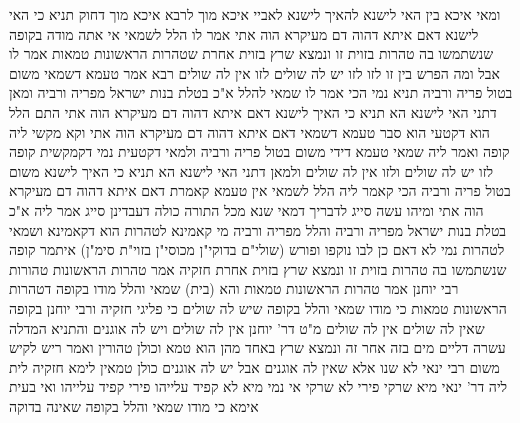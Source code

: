 \documentclass[12pt, openany]{book}
\begin{document}
{ומאי איכא בין האי לישנא להאיך לישנא  לאביי איכא מוך
לרבא איכא מוך דחוק 
תניא כי האי לישנא דאם איתא דהוה דם מעיקרא הוה אתי אמר לו הלל לשמאי  אי אתה מודה בקופה שנשתמשו בה טהרות בזוית זו ונמצא שרץ בזוית אחרת שטהרות הראשונות טמאות  אמר לו  אבל 
ומה הפרש בין זו לזו  לזו יש לה שולים לזו אין לה שולים 
רבא אמר  טעמא דשמאי משום בטול פריה ורביה  תניא נמי הכי אמר לו שמאי להלל  א"כ בטלת בנות ישראל מפריה ורביה 
ומאן דתני האי לישנא הא תניא כי האיך לישנא דאם איתא דהוה דם מעיקרא הוה אתי  התם הלל הוא דקטעי הוא סבר  טעמא דשמאי דאם איתא דהוה דם מעיקרא הוה אתי וקא מקשי ליה קופה 
ואמר ליה שמאי  טעמא דידי משום בטול פריה ורביה ולמאי דקטעית נמי דקמקשית קופה לזו יש לה שולים ולזו אין לה שולים 
ולמאן דתני האי לישנא הא תניא כי האיך לישנא משום בטול פריה ורביה 
הכי קאמר ליה הלל לשמאי  אין טעמא קאמרת דאם איתא דהוה דם מעיקרא הוה אתי ומיהו עשה סייג לדבריך דמאי שנא מכל התורה כולה דעבדינן סייג 
אמר ליה  א"כ בטלת בנות ישראל מפריה ורביה  והלל מפריה ורביה מי קאמינא  לטהרות הוא דקאמינא 
ושמאי לטהרות נמי לא דאם כן לבו נוקפו ופורש 
(שולי"ם בדוקי"ן מכוסי"ן בזוי"ת סימ"ן)  איתמר  קופה שנשתמשו בה טהרות בזוית זו ונמצא שרץ בזוית אחרת  חזקיה אמר  טהרות הראשונות טהורות  רבי יוחנן אמר  טהרות הראשונות טמאות  והא (בית) שמאי והלל מודו בקופה דטהרות הראשונות טמאות 
כי מודו שמאי והלל בקופה שיש לה שולים כי פליגי חזקיה ורבי יוחנן בקופה שאין לה שולים 
אין לה שולים מ"ט דר' יוחנן  אין לה שולים ויש לה אוגנים 
והתניא המדלה עשרה דליים מים בזה אחר זה ונמצא שרץ באחד מהן הוא טמא וכולן טהורין  ואמר ריש לקיש משום רבי ינאי  לא שנו אלא שאין לה אוגנים אבל יש לה אוגנים כולן טמאין 
לימא חזקיה לית ליה דר' ינאי  מיא שרקי פירי לא שרקי 
אי נמי  מיא לא קפיד עלייהו פירי קפיד עלייהו 
ואי בעית אימא  כי מודו שמאי והלל בקופה שאינה בדוקה}
\end{document}
